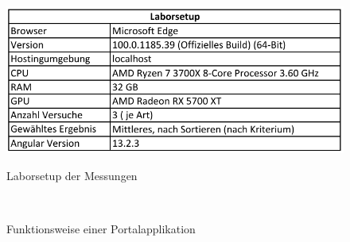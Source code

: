 \begin{figure}[hbt!]
	\centering
	\begin{minipage}[t]{1\textwidth}	
		\caption{Laborsetup der Messungen}
		\includegraphics[width=1\textwidth]{img/appendix/Laborsetup}\\ %
		\label{fig:Laborsetup}
	\end{minipage}
\end{figure}

\newpage
\begin{figure}[hbt!]
	\centering
	\begin{minipage}[t]{0.7\textwidth}	
		\caption{Funktionsweise einer Portalapplikation}
		\\ %
		\label{fig:AufgabenShell}
	\end{minipage}
\end{figure}

